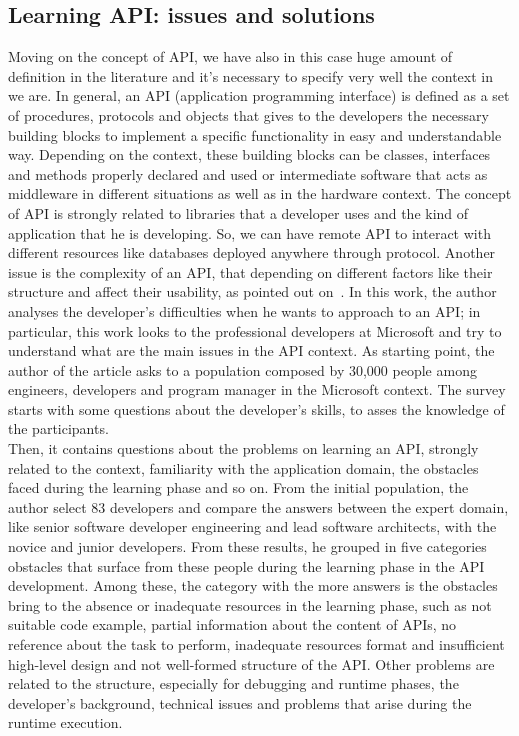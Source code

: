 \subsection{Learning API: issues and solutions}
Moving on the concept of API, we have also in this case huge amount of definition in the literature and it's necessary to specify very well the context in we are. In general, an API (application programming interface) is defined as a set of procedures, protocols and objects that gives to the developers the necessary building blocks to implement a specific functionality in easy and understandable way. Depending on the context, these building blocks can be classes, interfaces and methods properly declared and used or intermediate software that acts as middleware in different situations as well as in the hardware context. The concept of API is strongly related to libraries that a developer uses and the kind of application that he is developing. So, we can have remote API to interact with different resources like databases deployed anywhere through protocol. \newline
Another issue is the complexity of an API, that depending on different factors like their structure and affect their usability, as pointed out on~\cite{martin_p._robillard_what_2009}. In this work, the author analyses the developer's difficulties when he wants to approach to an API; in particular, this work looks to the professional developers at Microsoft and try to understand what are the main issues in the API context. As starting point, the author of the article asks to a population composed by 30,000 people among engineers, developers and program manager in the Microsoft context. The survey starts with some questions about the developer's skills, to asses the knowledge of the participants. \\
Then, it contains questions about the problems on learning an API, strongly related to the context, familiarity with the application domain, the obstacles faced during the learning phase and so on. From the initial population, the author select 83 developers and compare the answers between the expert domain, like senior software developer engineering and lead software architects, with the novice and junior developers. From these results, he grouped in five categories obstacles that surface from these people during the learning phase in the API development. Among these, the category with the more answers is the obstacles bring to the absence or inadequate resources in the learning phase, such as not suitable code example, partial information about the content of APIs, no reference about the task to perform, inadequate resources format and insufficient high-level design and not well-formed structure of the API. Other problems are related to the structure, especially for debugging and runtime phases, the developer's background, technical issues and problems that arise during the runtime execution.\\
